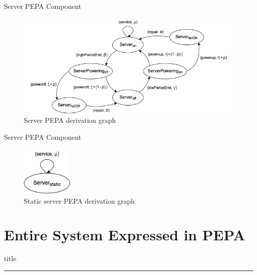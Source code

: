 \documentclass[8pt]{beamer}
\begin{document}
    \begin{frame}{Server PEPA Component}
        \begin{figure}[H]
            \centering
            \includegraphics[width=1.0\textwidth]{Images/server-derivation-graph.png}
            \caption{Server PEPA derivation graph}
            \label{fig:server-derivation-graph}
        \end{figure}
    \end{frame}
    
    \begin{frame}{Server PEPA Component}
        \begin{figure}[H]
            \centering
            \includegraphics[width=2.5cm]{Images/server-static-derivation-graph.png}
            \caption{Static server PEPA derivation graph}
            \label{fig:server-static-derivation-graph}
        \end{figure}
    \end{frame}
    
\section{Entire System Expressed in PEPA}
    \begin{frame}[plain]
        \vfill
        \centering
        \begin{beamercolorbox}[sep=8pt,center,shadow=true,rounded=true]{title}
            \insertsectionhead\par
            \color{univered}\noindent\rule{10cm}{1pt} \\
            \LARGE{\faFileTextO}
        \end{beamercolorbox}
        \vfill
    \end{frame}
    
\end{document}
